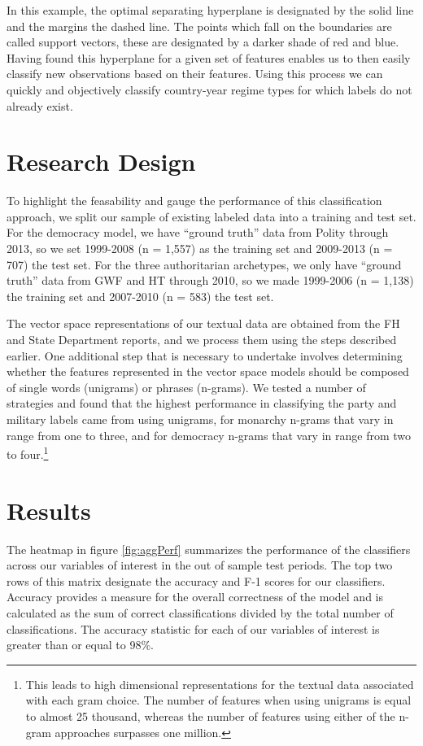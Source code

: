 \documentclass[pdftex,12pt,fullpage,oneside]{amsart}
\begin{document}
In this example, the optimal separating hyperplane is designated by the solid line and the margins the dashed line. The points which fall on the boundaries are called support vectors, these are designated by a darker shade of red and blue. Having found this hyperplane for a given set of features enables us to then easily classify new observations based on their features. Using this process we can quickly and objectively classify country-year regime types for which labels do not already exist.

\section{Research Design}

To highlight the feasability and gauge the performance of this classification approach, we split our sample of existing labeled data into a training and test set. For the democracy model, we have ``ground truth'' data from Polity through 2013, so we set 1999-2008 (n = 1,557) as the training set and 2009-2013 (n = 707) the test set. For the three authoritarian archetypes, we only have ``ground truth'' data from GWF and HT through 2010, so we made 1999-2006 (n = 1,138) the training set and 2007-2010 (n = 583) the test set. 

The vector space representations of our textual data are obtained from the FH and State Department reports, and we process them using the steps described earlier. One additional step that is necessary to undertake involves determining whether the features represented in the vector space models should be composed of single words (unigrams) or phrases (n-grams). We tested a number of strategies and found that the highest performance in classifying the party and military labels came from using unigrams, for monarchy n-grams that vary in range from one to three, and for democracy n-grams that vary in range from two to four.\footnote{This leads to high dimensional representations for the textual data associated with each gram choice. The number of features when using unigrams is equal to almost 25 thousand, whereas the number of features using either of the n-gram approaches surpasses one million.}

\section{Results}

The heatmap in figure \ref{fig:aggPerf} summarizes the performance of the classifiers across our variables of interest in the out of sample test periods. The top two rows of this matrix designate the accuracy and F-1 scores for our classifiers. Accuracy provides a measure for the overall correctness of the model and is calculated as the sum of correct classifications divided by the total number of classifications. The accuracy statistic for each of our variables of interest is greater than or equal to 98\%. 
\end{document}
